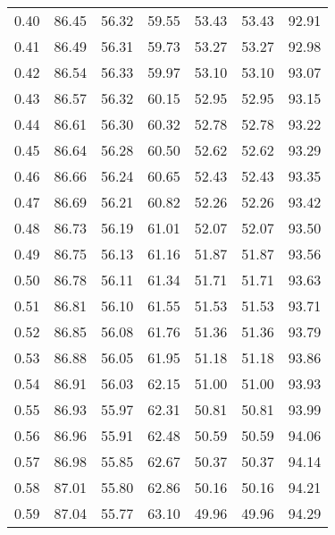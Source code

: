 \begin{tabular}{|c|c|c|c|c|c|c|}
      0.40 &     86.45 &     56.32 &      59.55 &   53.43 &      53.43 &         92.91 \\
      0.41 &     86.49 &     56.31 &      59.73 &   53.27 &      53.27 &         92.98 \\
      0.42 &     86.54 &     56.33 &      59.97 &   53.10 &      53.10 &         93.07 \\
      0.43 &     86.57 &     56.32 &      60.15 &   52.95 &      52.95 &         93.15 \\
      0.44 &     86.61 &     56.30 &      60.32 &   52.78 &      52.78 &         93.22 \\
      0.45 &     86.64 &     56.28 &      60.50 &   52.62 &      52.62 &         93.29 \\
      0.46 &     86.66 &     56.24 &      60.65 &   52.43 &      52.43 &         93.35 \\
      0.47 &     86.69 &     56.21 &      60.82 &   52.26 &      52.26 &         93.42 \\
      0.48 &     86.73 &     56.19 &      61.01 &   52.07 &      52.07 &         93.50 \\
      0.49 &     86.75 &     56.13 &      61.16 &   51.87 &      51.87 &         93.56 \\
      0.50 &     86.78 &     56.11 &      61.34 &   51.71 &      51.71 &         93.63 \\
      0.51 &     86.81 &     56.10 &      61.55 &   51.53 &      51.53 &         93.71 \\
      0.52 &     86.85 &     56.08 &      61.76 &   51.36 &      51.36 &         93.79 \\
      0.53 &     86.88 &     56.05 &      61.95 &   51.18 &      51.18 &         93.86 \\
      0.54 &     86.91 &     56.03 &      62.15 &   51.00 &      51.00 &         93.93 \\
      0.55 &     86.93 &     55.97 &      62.31 &   50.81 &      50.81 &         93.99 \\
      0.56 &     86.96 &     55.91 &      62.48 &   50.59 &      50.59 &         94.06 \\
      0.57 &     86.98 &     55.85 &      62.67 &   50.37 &      50.37 &         94.14 \\
      0.58 &     87.01 &     55.80 &      62.86 &   50.16 &      50.16 &         94.21 \\
      0.59 &     87.04 &     55.77 &      63.10 &   49.96 &      49.96 &         94.29 \\

\end{tabular}

